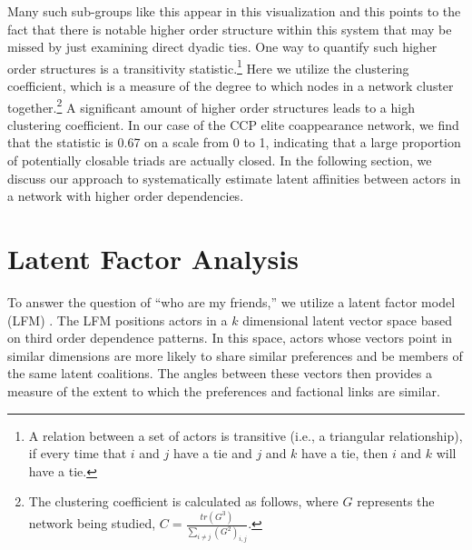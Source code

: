 \documentclass[11pt,english]{article}
\begin{document}
\begin{flushleft}
Many such sub-groups like this appear in this visualization and this points to the fact that there is notable higher order structure within this system that may be missed by just examining direct dyadic ties. One way to quantify such higher order structures is a transitivity statistic.\footnote{A relation between a set of actors is transitive (i.e., a triangular relationship), if every time that $i$ and $j$ have a tie and $j$ and $k$ have a tie, then $i$ and $k$ will have a tie.} Here we utilize the clustering coefficient, which is a measure of the degree to which nodes in a network cluster together.\footnote{The clustering coefficient is calculated as follows, where $G$ represents the network being studied, $C=\frac{tr(G^{3})}{\sum_{i\neq j}(G^{2})_{i,j}}$.} A significant amount of higher order structures  leads to a high clustering coefficient. In our case of the CCP elite coappearance network, we find that the statistic is 0.67 on a scale from 0 to 1, indicating that a large proportion of potentially closable triads are actually closed. In the following section, we discuss our approach to systematically estimate latent affinities between actors in a network with higher order dependencies.

\section*{Latent Factor Analysis}

To answer the question of ``who are my friends,'' we utilize a latent factor model (LFM) \citep{Hoff2002,Hoff2005,Minhas2016a,hoff2018additive}. The LFM positions actors in a $k$ dimensional latent vector space based on third order dependence patterns. In this space, actors whose vectors point in similar dimensions are more likely to share similar preferences and be members of the same latent coalitions. The angles between these vectors then provides a measure of the extent to which the preferences and factional links are similar. %


\end{flushleft}
\end{document}
